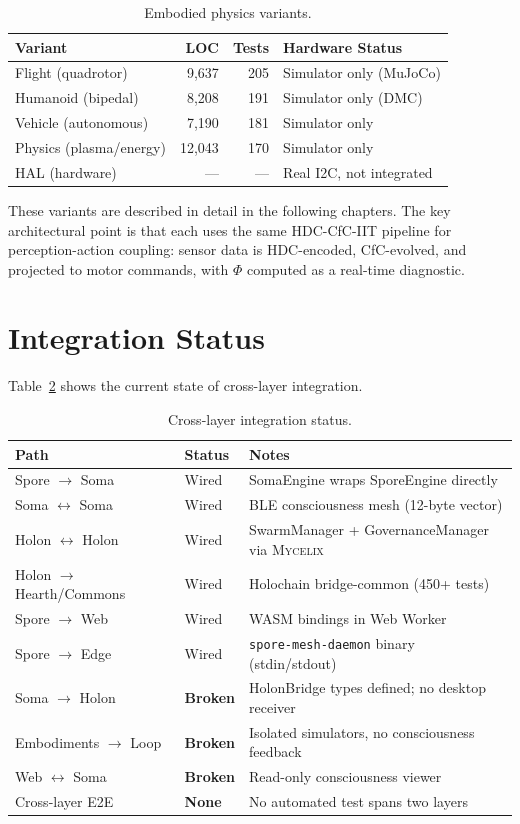 \documentclass[12pt]{book}
\newcommand{\mycelix}{\textsc{Mycelix}}
\begin{document}
\begin{table}[H]
\centering
\caption{Embodied physics variants.}
\label{tab:embodied-variants}
\begin{tabular}{lrrl}
\toprule
\textbf{Variant} & \textbf{LOC} & \textbf{Tests} & \textbf{Hardware Status} \\
\midrule
Flight (quadrotor) & 9,637 & 205 & Simulator only (MuJoCo) \\
Humanoid (bipedal) & 8,208 & 191 & Simulator only (DMC) \\
Vehicle (autonomous) & 7,190 & 181 & Simulator only \\
Physics (plasma/energy) & 12,043 & 170 & Simulator only \\
HAL (hardware) & --- & --- & Real I2C, not integrated \\
\bottomrule
\end{tabular}
\end{table}

These variants are described in detail in the following chapters. The key architectural point is that each uses the same HDC-CfC-IIT pipeline for perception-action coupling: sensor data is HDC-encoded, CfC-evolved, and projected to motor commands, with $\Phi$ computed as a real-time diagnostic.

\section{Integration Status}

Table~\ref{tab:fractal-integration} shows the current state of cross-layer integration.

\begin{table}[H]
\centering
\caption{Cross-layer integration status.}
\label{tab:fractal-integration}
\begin{tabular}{llp{6cm}}
\toprule
\textbf{Path} & \textbf{Status} & \textbf{Notes} \\
\midrule
Spore $\to$ Soma & Wired & SomaEngine wraps SporeEngine directly \\
Soma $\leftrightarrow$ Soma & Wired & BLE consciousness mesh (12-byte vector) \\
Holon $\leftrightarrow$ Holon & Wired & SwarmManager + GovernanceManager via \mycelix{} \\
Holon $\to$ Hearth/Commons & Wired & Holochain bridge-common (450+ tests) \\
Spore $\to$ Web & Wired & WASM bindings in Web Worker \\
Spore $\to$ Edge & Wired & \texttt{spore-mesh-daemon} binary (stdin/stdout) \\
\midrule
Soma $\to$ Holon & \textbf{Broken} & HolonBridge types defined; no desktop receiver \\
Embodiments $\to$ Loop & \textbf{Broken} & Isolated simulators, no consciousness feedback \\
Web $\leftrightarrow$ Soma & \textbf{Broken} & Read-only consciousness viewer \\
Cross-layer E2E & \textbf{None} & No automated test spans two layers \\
\bottomrule
\end{tabular}
\end{table}
\end{document}
